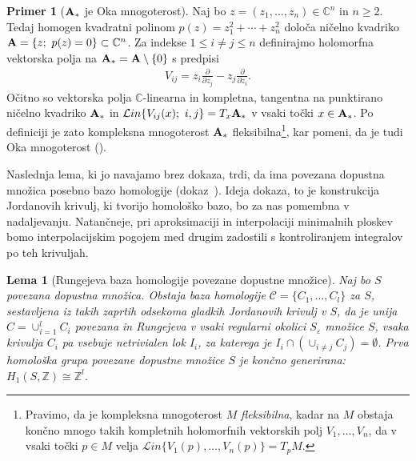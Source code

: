 \documentclass[12pt,a4paper,twoside]{article}
\theoremstyle{definition} %
\newtheorem{primer}[definicija]{Primer}
\theoremstyle{plain} %
\newtheorem{lema}[definicija]{Lema}
\numberwithin{equation}{section}  %
\begin{document}
\begin{primer} [$\textbf{\textup{A}}_{*}$ je Oka mnogoterost] \label{primer-oka}
Naj bo $z = (z_{1}, \dots , z_{n}) \in \mathbb{C}^{n}$ in $n \geq 2$. Tedaj  homogen kvadratni polinom $p(z) = z_{1}^{2} + \cdots + z_{n}^{2}$ določa ničelno kvadriko $\textbf{\textup{A}} = \{z ; \ p(z)=0 \} \subset \mathbb{C}^{n}$.
Za indekse $1 \leq i \neq j \leq n$ definirajmo holomorfna vektorska polja na $ \textbf{\textup{A}}_{*} = \textbf{\textup{A}} \setminus \{ 0 \}$ s predpisi
\begin{gather*}
V_{ij} = z_{i} \frac{\partial}{\partial z_{j}} - z_{j} \frac{\partial}{\partial z_{i}}.
\end{gather*}
Očitno so vektorska polja $\mathbb{C}$-linearna in kompletna, tangentna na punktirano ničelno kvadriko $\textbf{\textup{A}}_{*}$ in $\mathcal{L}in \{ V_{ij}(x) ; \ i,j \} = T_{x}\textbf{\textup{A}}_{*}$ v vsaki točki $x \in \textbf{\textup{A}}_{*}$. Po definiciji je zato kompleksna mnogoterost $\textbf{\textup{A}}_{*}$ fleksibilna\footnote{Pravimo, da je kompleksna mnogoterost $M$ \emph{fleksibilna}, kadar na $M$ obstaja končno mnogo takih kompletnih holomorfnih vektorskih polj $V_{1}, \dots , V_{n}$, da v vsaki točki $p \in M$ velja $\mathcal{L}in \{ V_{1}(p), \dots , V_{n}(p) \} = T_{p}M$.}, 
kar pomeni, da je tudi Oka mnogoterost (\cite[Definition~1.13.7]{alarcon2021minimal}).
\end{primer}

Naslednja lema, ki jo navajamo brez dokaza, trdi, da ima povezana dopustna množica posebno bazo homologije (dokaz~\cite[str.~69--71]{alarcon2021minimal}). Ideja dokaza, to je konstrukcija Jordanovih krivulj, ki tvorijo homološko bazo, bo za nas pomembna v nadaljevanju. Natančneje, pri aproksimaciji in interpolaciji minimalnih ploskev bomo interpolacijskim pogojem med drugim zadostili s kontroliranjem integralov po teh krivuljah.

\begin{lema} [Rungejeva baza homologije povezane dopustne množice] \label{lema:Runge-hom-baza}
Naj bo $S$ povezana dopustna množica. Obstaja baza homologije $\mathcal{C} = \{ C_{1}, \dots , C_{l} \}$ za $S$, sestavljena iz takih zaprtih odsekoma gladkih Jordanovih krivulj v $S$, da je unija $C = \cup_{i=1}^{l} C_{i}$ povezana in Rungejeva v vsaki regularni okolici $S_{\varepsilon}$ množice $S$, vsaka krivulja $C_{i}$ pa vsebuje netrivialen lok $I_{i}$, za katerega je $I_{i} \cap (\cup_{i \neq j} C_{j}) = \emptyset$.
Prva homološka grupa povezane dopustne množice $S$ je končno generirana: $H_{1}(S, \mathbb{Z}) \cong \mathbb{Z}^{l}$.
\end{lema}
\end{document}
